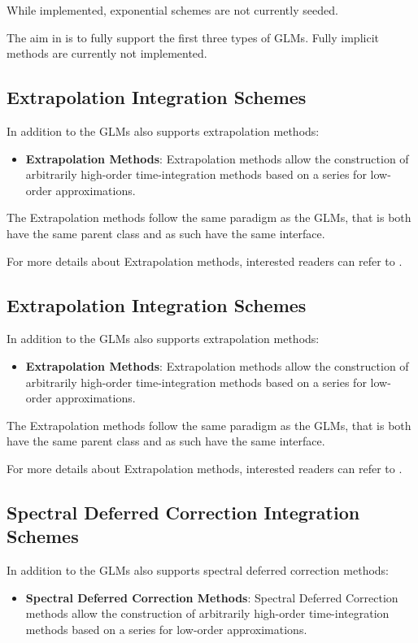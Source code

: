   While implemented, exponential schemes are not currently seeded.

The aim in {\nek} is to fully support the first three types of GLMs.
Fully implicit methods are currently not implemented.

\subsection{Extrapolation Integration Schemes}

In addition to the GLMs {\nek} also supports extrapolation methods:
\begin{itemize}
  \item \textbf{Extrapolation Methods}: Extrapolation methods allow 
    the construction of arbitrarily high-order time-integration 
    methods based on a series for low-order approximations.
\end{itemize}

The Extrapolation methods follow the same paradigm as the GLMs, that is
both have the same parent class and as such have the same interface.

For more details about Extrapolation methods, interested readers can refer
to \cite{Deuflhard1985}.


\subsection{Extrapolation Integration Schemes}

In addition to the GLMs {\nek} also supports extrapolation methods:
\begin{itemize}
  \item \textbf{Extrapolation Methods}: Extrapolation methods allow 
    the construction of arbitrarily high-order time-integration 
    methods based on a series for low-order approximations.
\end{itemize}

The Extrapolation methods follow the same paradigm as the GLMs, that is
both have the same parent class and as such have the same interface.

For more details about Extrapolation methods, interested readers can refer
to \cite{Deuflhard1985}.

\subsection{Spectral Deferred Correction Integration Schemes}

In addition to the GLMs {\nek} also supports spectral deferred correction 
methods:
\begin{itemize}
  \item \textbf{Spectral Deferred Correction Methods}: Spectral Deferred 
    Correction methods allow the construction of arbitrarily high-order 
    time-integration methods based on a series for low-order approximations.
\end{itemize}

